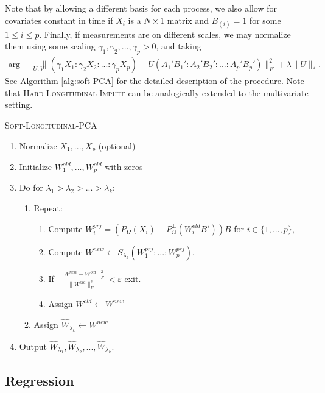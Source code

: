 \documentclass[preprint]{imsart}
\numberwithin{equation}{section}
\theoremstyle{plain}
\DeclareMathOperator*{\argmin}{arg\,min}
\begin{document}
Note that by allowing a different basis for each process, we also allow for covariates constant in time if $X_i$ is a $N\times 1$ matrix and $B_{(i)} = 1$ for some $1 \leq i \leq p$.
Finally, if measurements are on different scales, we may normalize them using some scaling $\gamma_1, \gamma_2,..., \gamma_p > 0$, and taking
\begin{align*}%
\argmin_{U,V} &\| (\gamma_1 X_{1}:\gamma_2 X_{2}:...:\gamma_p X_{p}) - U (A_1'B_1':A_2'B_2':...:A_p'B_p') \|_F^2 + \lambda\|U\|_*.
\end{align*}
See Algorithm \ref{alg:soft-PCA} for the detailed description of the procedure. Note that \textsc{Hard-Longitudinal-Impute} can be analogically extended to the multivariate setting. %

\begin{algorithm}
\caption{\textsc{Soft-Longitudinal-PCA}\label{alg:soft-PCA}}
\begin{enumerate}
\item Normalize $X_1,...,X_p$ (optional)
\item Initialize $W^{old}_1,...,W^{old}_p$ with zeros
\item Do for $\lambda_1 > \lambda_2 > ... > \lambda_k$:
\begin{enumerate}
\item Repeat:
\begin{enumerate}
\item Compute $W^{prj}_i = (P_\Omega(X_i) + P_\Omega^\perp(W_i^{old}B'))B$ for $i \in \{1,...,p\}$,
\item Compute $W^{new} \leftarrow S_{\lambda_k}( W^{prj}_1 : ... : W^{prj}_p )$.
\item If $\frac{\|W^{new} - W^{old}\|_F^2}{\|W^{old}\|_F^2} < \varepsilon$ exit.
\item Assign $W^{old} \leftarrow W^{new}$
\end{enumerate}
\item Assign $\hat{W}_{\lambda_k} \leftarrow W^{new}$
\end{enumerate}
\item Output $\hat{W}_{\lambda_1}, \hat{W}_{\lambda_2}, ... , \hat{W}_{\lambda_k}$.
\end{enumerate}
\end{algorithm}

\subsection{Regression}\label{ss:regression}
\end{document}
